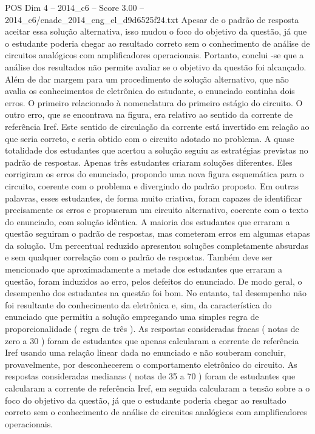 \begin{textsample}{POS Dim 4 – 2014\_c6 – Score 3.00 – 2014\_c6/enade\_2014\_eng\_el\_d9d6525f24.txt}
Apesar de o padrão de resposta aceitar essa solução alternativa, isso mudou o foco do objetivo da questão, já que o estudante poderia chegar ao resultado correto sem o conhecimento de análise de circuitos analógicos com amplificadores operacionais.
Portanto, conclui -se que a análise dos resultados não permite avaliar se o objetivo da questão foi alcançado.
Além de dar margem para um procedimento de solução alternativo, que não avalia os conhecimentos de eletrônica do estudante, o enunciado continha dois erros.
O primeiro relacionado à nomenclatura do primeiro estágio do circuito.
O outro erro, que se encontrava na figura, era relativo ao sentido da corrente de referência Iref.
Este sentido de circulação da corrente está invertido em relação ao que seria correto, e seria obtido com o circuito adotado no problema.
A quase totalidade dos estudantes que acertou a solução seguiu as estratégias previstas no padrão de respostas.
Apenas três estudantes criaram soluções diferentes.
Eles corrigiram os erros do enunciado, propondo uma nova figura esquemática para o circuito, coerente com o problema e divergindo do padrão proposto.
Em outras palavras, esses estudantes, de forma muito criativa, foram capazes de identificar precisamente os erros e propuseram um circuito alternativo, coerente com o texto do enunciado, com solução idêntica.
A maioria dos estudantes que erraram a questão seguiram o padrão de respostas, mas cometeram erros em algumas etapas da solução.
Um percentual reduzido apresentou soluções completamente absurdas e sem qualquer correlação com o padrão de respostas.
Também deve ser mencionado que aproximadamente a metade dos estudantes que erraram a questão, foram induzidos ao erro, pelos defeitos do enunciado.
De modo geral, o desempenho dos estudantes na questão foi bom.
No entanto, tal desempenho não foi resultante do conhecimento da eletrônica e, sim, da característica do enunciado que permitiu a solução empregando uma simples regra de proporcionalidade ( regra de três ).
As respostas consideradas fracas ( notas de zero a 30 ) foram de estudantes que apenas calcularam a corrente de referência Iref usando uma relação linear dada no enunciado e não souberam concluir, provavelmente, por desconhecerem o comportamento eletrônico do circuito.
As respostas consideradas medianas ( notas de 35 a 70 ) foram de estudantes que calcularam a corrente de referência Iref, em seguida calcularam a tensão sobre a o foco do objetivo da questão, já que o estudante poderia chegar ao resultado correto sem o conhecimento de análise de circuitos analógicos com amplificadores operacionais.

\end{textsample}
